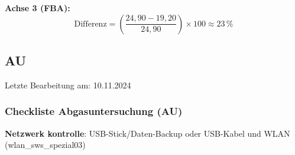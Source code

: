 \documentclass{vorlage-design-main}
\begin{document}
\textbf{Achse 3 (FBA):}
\[\text{Differenz} = \left( \frac{24,90 - 19,20}{24,90} \right) \times 100 \approx 23 \, \%\]

\newpage

\subsection{AU}\label{au}

Letzte Bearbeitung am: 10.11.2024

\subsubsection{Checkliste Abgasuntersuchung
(AU)}\label{checkliste-abgasuntersuchung-au}

\textbf{Netzwerk kontrolle}: USB-Stick/Daten-Backup oder USB-Kabel und
WLAN (wlan\_sws\_spezial03)
\end{document}
